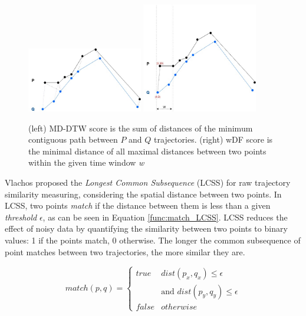\documentclass[12pt]{article}
\begin{document}
\begin{figure}[h]
\centering
\includegraphics[width=0.45\textwidth]{Related_Works/related_trajes-DTW.jpg}
\includegraphics[width=0.45\textwidth]{Related_Works/related_trajes-wDF.jpg}
\caption{\label{fig:related_trajes_wDF_DTW}(left) {MD-DTW score is the sum of distances of the minimum contiguous path between $P$ and $Q$ trajectories}. (right) wDF score is the minimal distance of all maximal distances between two points within the given time window \textit{w}}
\end{figure}

Vlachos \cite{vlachos2002discovering} proposed the \emph{Longest Common Subsequence} (LCSS) for raw trajectory similarity measuring, considering the spatial distance between two points. In {LCSS}, two points \textit{match} if the distance between them is less than a given \textit{threshold} $\epsilon$, as can be seen in Equation \ref{func:match_LCSS}. LCSS reduces the effect of noisy data by quantifying the similarity between two points to binary values: 1 if the points match, 0 otherwise. The longer the common subsequence of point matches between two trajectories, the more similar they are. 


\begin{equation}
\label{func:match_LCSS}
  match(p, q) = 
  \begin{cases} 
      true & dist(p_x, q_x)  \leq \epsilon\\ 
        &            \text{and } dist(p_y, q_y)  \leq \epsilon\\
      false & otherwise
  \end{cases}
\end{equation}
\end{document}

